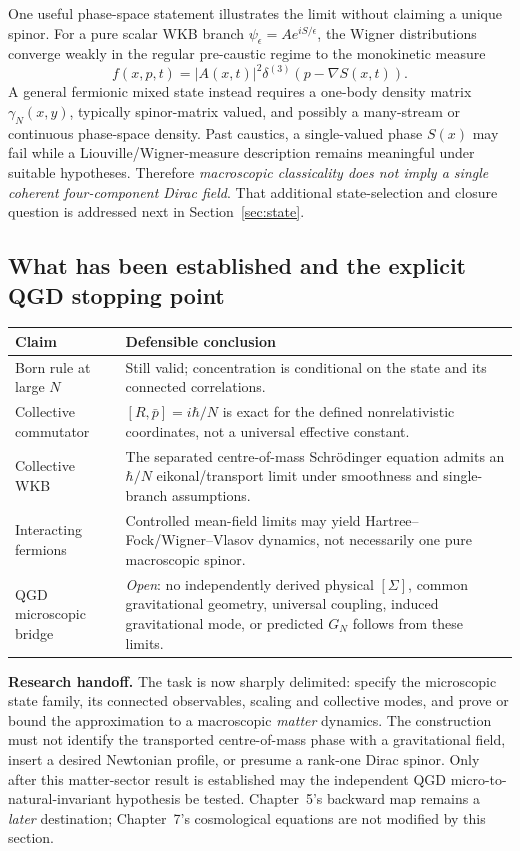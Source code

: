 \documentclass[11pt,a4paper]{article}
\begin{document}
One useful phase-space statement illustrates the limit without claiming a unique spinor. For a pure scalar WKB branch $\psi_\epsilon=Ae^{iS/\epsilon}$, the Wigner distributions converge weakly in the regular pre-caustic regime to the monokinetic measure
\begin{equation}\label{eq:qgd-largeN-Wigner}
\boxed{f(x,p,t)=|A(x,t)|^2\delta^{(3)}(p-\nabla S(x,t)).}
\end{equation}
A general fermionic mixed state instead requires a one-body density matrix $\gamma_N(x,y)$, typically spinor-matrix valued, and possibly a many-stream or continuous phase-space density. Past caustics, a single-valued phase $S(x)$ may fail while a Liouville/Wigner-measure description remains meaningful under suitable hypotheses. Therefore \emph{macroscopic classicality does not imply a single coherent four-component Dirac field}. That additional state-selection and closure question is addressed next in Section~\ref{sec:state}.

\subsection{What has been established and the explicit QGD stopping point}
\label{subsec:qgd-largeN-ledger}
\begin{center}\small
\begin{tabular}{@{}p{.27\linewidth}p{.60\linewidth}@{}}\toprule
Claim & Defensible conclusion\\\midrule
Born rule at large $N$ & Still valid; concentration is conditional on the state and its connected correlations.\\
Collective commutator & $[R,\bar p]=i\hbar/N$ is exact for the defined nonrelativistic coordinates, not a universal effective constant.\\
Collective WKB & The separated centre-of-mass Schr\"odinger equation admits an $\hbar/N$ eikonal/transport limit under smoothness and single-branch assumptions.\\
Interacting fermions & Controlled mean-field limits may yield Hartree--Fock/Wigner--Vlasov dynamics, not necessarily one pure macroscopic spinor.\\
QGD microscopic bridge & \emph{Open}: no independently derived physical $[\Sigma]$, common gravitational geometry, universal coupling, induced gravitational mode, or predicted $G_N$ follows from these limits.\\\bottomrule
\end{tabular}
\end{center}
\noindent\textbf{Research handoff.}
The task is now sharply delimited: specify the microscopic state family, its connected observables, scaling and collective modes, and prove or bound the approximation to a macroscopic \emph{matter} dynamics. The construction must not identify the transported centre-of-mass phase with a gravitational field, insert a desired Newtonian profile, or presume a rank-one Dirac spinor. Only after this matter-sector result is established may the independent QGD micro-to-natural-invariant hypothesis be tested. Chapter~5's backward map remains a \emph{later} destination; Chapter~7's cosmological equations are not modified by this section.
\end{document}
